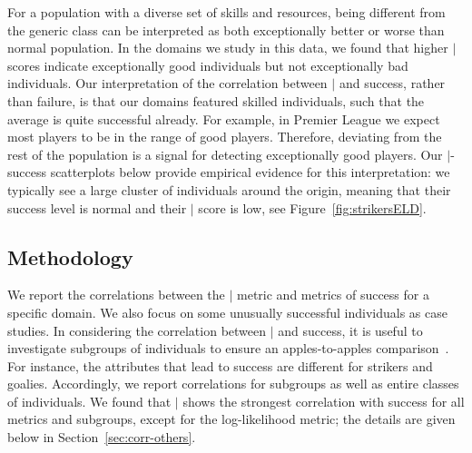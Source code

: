 {For a population with a diverse set of skills and resources,
being different from the generic class can be interpreted as both exceptionally better or worse than normal population. In the domains we study in this data, we found that higher $\mid$ scores indicate exceptionally good individuals but not exceptionally bad individuals. Our interpretation of the correlation between $\mid$ and success, rather than failure, is that our domains featured skilled individuals, such that the average is quite successful already. 
For example, in Premier League we expect most players to be in the range of good players. Therefore, deviating from the rest of the population is a signal for detecting exceptionally good players. Our $\mid$-success scatterplots below provide empirical evidence for this interpretation: we typically see a large cluster of individuals around the origin, meaning that their success level is normal and their $\mid$ score is low, see Figure~\ref{fig:strikersELD}. %

\subsection{Methodology}

We report the correlations between the $\mid$ metric and metrics of success for a specific domain. We also focus on some unusually successful individuals as case studies. 
In considering the correlation between $\mid$ and success, it is useful to investigate subgroups of individuals to ensure an apples-to-apples comparison~\cite{Sun2009}. For instance, the attributes that lead to success are different for strikers and goalies.  Accordingly, we report correlations for subgroups as well as entire classes of individuals. We found that $\mid$ shows the strongest correlation with success for all metrics and subgroups, except for the log-likelihood metric; the details are given below in Section~\ref{sec:corr-others}. 
	


}
